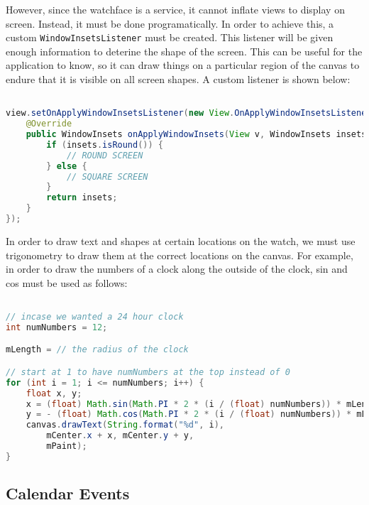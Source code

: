 However, since the watchface is a service, it cannot inflate views to display on
screen. Instead, it must be done programatically. In order to achieve this, a
custom \texttt{WindowInsetsListener} must be created. This listener will be
given enough information to deterine the shape of the screen. This can be useful
for the application to know, so it can draw things on a particular region of the
canvas to endure that it is visible on all screen shapes. A custom listener is
shown below:

\begin{lstlisting}[language=Java]

view.setOnApplyWindowInsetsListener(new View.OnApplyWindowInsetsListener() {
    @Override
    public WindowInsets onApplyWindowInsets(View v, WindowInsets insets) {
        if (insets.isRound()) {
            // ROUND SCREEN
        } else {
            // SQUARE SCREEN
        }
        return insets;
    }
});

\end{lstlisting}

In order to draw text and shapes at certain locations on the watch, we must use
trigonometry to draw them at the correct locations on the canvas. For example,
in order to draw the numbers of a clock along the outside of the clock, sin and
cos must be used as follows:

\begin{lstlisting}[language=Java]

// incase we wanted a 24 hour clock
int numNumbers = 12;

mLength = // the radius of the clock

// start at 1 to have numNumbers at the top instead of 0
for (int i = 1; i <= numNumbers; i++) {
    float x, y;
    x = (float) Math.sin(Math.PI * 2 * (i / (float) numNumbers)) * mLength;
    y = - (float) Math.cos(Math.PI * 2 * (i / (float) numNumbers)) * mLength;
    canvas.drawText(String.format("%d", i),
        mCenter.x + x, mCenter.y + y,
        mPaint);
}

\end{lstlisting}

\subsection{Calendar Events}

